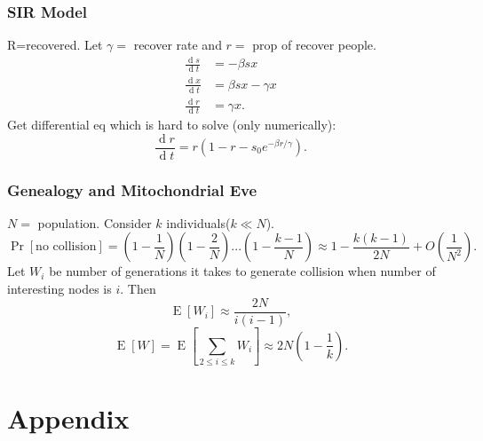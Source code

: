 \documentclass[a4paper,twocolumn,10pt]{article}
\newcommand{\pte}[1]{\left({#1}\right)}
\newcommand{\op}{\operatorname}
\newcommand{\E}{\operatorname{E}}
\newcommand{\dd}{\op{d}}
\begin{document}
	\subsubsection{SIR Model}
		R=recovered. Let $\gamma=$ recover rate and $r=$ prop of recover people.
		\[ \begin{split}
			\frac{\dd s}{\dd t} &= -\beta s x \\
			\frac{\dd x}{\dd t} &= \beta s x - \gamma x \\
			\frac{\dd r}{\dd t} &= \gamma x.
		\end{split} \]
		Get differential eq which is hard to solve (only numerically):
		\[
			\frac{\dd r}{\dd t} =
				r\pte{1-r-s_0 e^{-\beta r/\gamma}}.
		\]

	\subsubsection{Genealogy and Mitochondrial Eve}
		$N=$ population. Consider $k$ individuals($k\ll N$).
		\[
		\Pr[\textrm{no collision}] = \pte{1-\frac{1}{N}} \pte{1-\frac{2}{N}}
		... \pte{1-\frac{k-1}{N}} \approx 1 - \frac{k(k-1)}{2N} + O\pte{\frac{1}{N^2}}.
		\]
		Let $W_i$ be number of generations it takes to generate collision when
			number of interesting nodes is $i$.
		Then
		\[
			\E[W_i]\approx \frac{2N}{i(i-1)},
		\]
		\[
			\E[W]=\E\left[\sum_{2\le i\le k} W_i\right]\approx 2N\pte{1-\frac{1}{k}}.
		\]
		
\section{Appendix}

\end{document}
